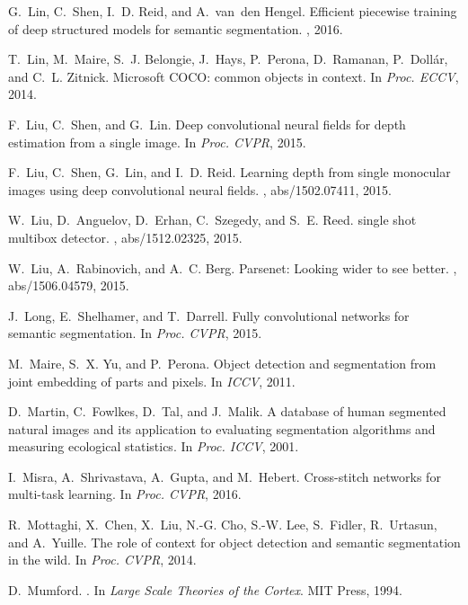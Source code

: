 \documentclass[10pt,twocolumn,letterpaper]{article}
\begin{document}
\begin{thebibliography}{100}
	G.~Lin, C.~Shen, I.~D. Reid, and A.~van~den Hengel.
	\newblock Efficient piecewise training of deep structured models for semantic
	segmentation.
	, 2016.
	
	T.~Lin, M.~Maire, S.~J. Belongie, J.~Hays, P.~Perona, D.~Ramanan,
	P.~Doll{\'{a}}r, and C.~L. Zitnick.
	\newblock Microsoft {COCO:} common objects in context.
	\newblock In {\em Proc. {ECCV}}, 2014.
	
	F.~Liu, C.~Shen, and G.~Lin.
	\newblock Deep convolutional neural fields for depth estimation from a single
	image.
	\newblock In {\em Proc. {CVPR}}, 2015.
	
	F.~Liu, C.~Shen, G.~Lin, and I.~D. Reid.
	\newblock Learning depth from single monocular images using deep convolutional
	neural fields.
	, abs/1502.07411, 2015.
	
	W.~Liu, D.~Anguelov, D.~Erhan, C.~Szegedy, and S.~E. Reed.
	 single shot multibox detector.
	, abs/1512.02325, 2015.
	
	W.~Liu, A.~Rabinovich, and A.~C. Berg.
	\newblock Parsenet: Looking wider to see better.
	, abs/1506.04579, 2015.
	
	J.~Long, E.~Shelhamer, and T.~Darrell.
	\newblock Fully convolutional networks for semantic segmentation.
	\newblock In {\em Proc. {CVPR}}, 2015.
	
	M.~Maire, S.~X. Yu, and P.~Perona.
	\newblock Object detection and segmentation from joint embedding of parts and
	pixels.
	\newblock In {\em ICCV}, 2011.
	
	D.~Martin, C.~Fowlkes, D.~Tal, and J.~Malik.
	\newblock A database of human segmented natural images and its application to
	evaluating segmentation algorithms and measuring ecological statistics.
	\newblock In {\em Proc. {ICCV}}, 2001.
	
	I.~Misra, A.~Shrivastava, A.~Gupta, and M.~Hebert.
	\newblock Cross-stitch networks for multi-task learning.
	\newblock In {\em Proc. {CVPR}}, 2016.
	
	R.~Mottaghi, X.~Chen, X.~Liu, N.-G. Cho, S.-W. Lee, S.~Fidler, R.~Urtasun, and
	A.~Yuille.
	\newblock The role of context for object detection and semantic segmentation in
	the wild.
	\newblock In {\em Proc. {CVPR}}, 2014.
	
	D.~Mumford.
	.
	\newblock In {\em Large Scale Theories of the Cortex}. MIT Press, 1994.
	

\end{thebibliography}
\end{document}
